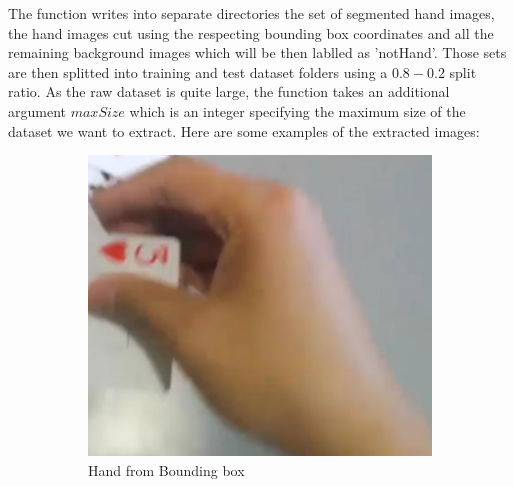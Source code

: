 The function writes into separate directories the set of segmented hand images, the hand images cut using the respecting bounding box coordinates and all the remaining background images
which will be then lablled as 'notHand'. Those sets are then splitted into training and test dataset folders using a $0.8-0.2$ split ratio. As the raw dataset is quite large, the function takes
an additional argument $maxSize$ which is an integer specifying the maximum size of the dataset we want to extract. Here are some examples of the extracted images:

\begin{figure}
    \centering
    \begin{subfigure}[b]{0.3 \textwidth}
        \centering
        \includegraphics[width=\textwidth]{images/hand/2170.jpg}
        \caption{Hand from Bounding box}
        \label{fig:handBoundeed}
    \end{subfigure}
    \hfill
    \begin{subfigure}[b]{0.3\textwidth}
        \centering

\end{subfigure}
\end{figure}
